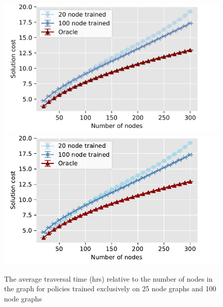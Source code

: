 
\begin{figure}[t]
\begin{center}
\iflatexml
\includegraphics[width=6\columnwidth]{figs/sizes.png}
\else
\includegraphics[width=0.94\columnwidth]{figs/sizes.pdf}
\fi
\vspace{-0.2in}
\caption{The average traversal time (hrs) relative to the number of nodes in the graph
for policies trained exclusively on 25 node graphs and 100 node graphs
}
\vspace{-0.25in}
\label{fig:retrained}
\end{center}
\end{figure}